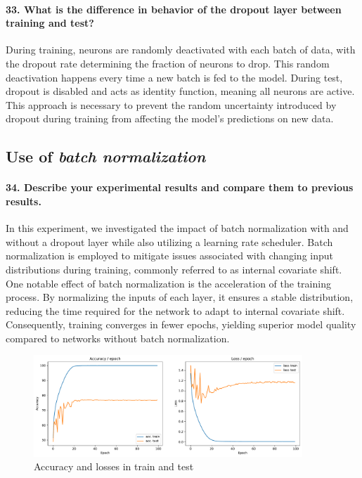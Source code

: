 \paragraph{33. What is the difference in behavior of the dropout layer between training and test?}
During training, neurons are randomly deactivated with each batch of data, with the dropout rate determining the fraction of neurons to drop. This random deactivation happens every time a new batch is fed to the model. During test, dropout is disabled and acts as identity function, meaning all neurons are active. This approach is necessary to prevent the random uncertainty introduced by dropout during training from affecting the model's predictions on new data.

\subsection{Use of \textit{batch normalization}}

\paragraph{34. Describe your experimental results and compare them to previous results.}

In this experiment, we investigated the impact of batch normalization with and without a dropout layer while also utilizing a learning rate scheduler. Batch normalization is employed to mitigate issues associated with changing input distributions during training, commonly referred to as internal covariate shift. One notable effect of batch normalization is the acceleration of the training process. By normalizing the inputs of each layer, it ensures a stable distribution, reducing the time required for the network to adapt to internal covariate shift. Consequently, training converges in fewer epochs, yielding superior model quality compared to networks without batch normalization.

\begin{figure}[H]
    \centering
    \includegraphics*[width=0.9\textwidth]{figs/CNN/batchnorm.pdf}
    \caption{Accuracy and losses in train and test}
    \label{fig:batchnorm}
\end{figure}

